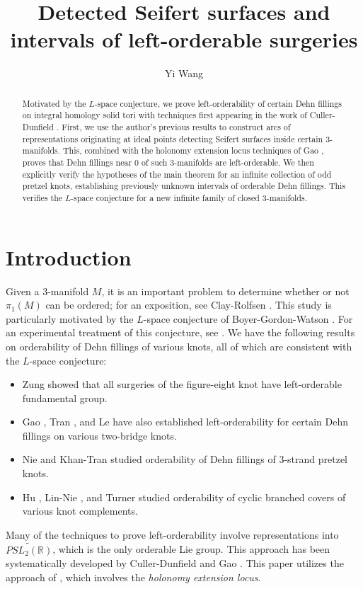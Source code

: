 \documentclass{article}
\title{Detected Seifert surfaces and intervals of left-orderable surgeries}
\author{Yi Wang}
\date{}
\theoremstyle{plain}
\theoremstyle{definition}
\theoremstyle{plain}
\theoremstyle{plain}
\theoremstyle{plain}
\theoremstyle{remark}
\theoremstyle{remark}
\theoremstyle{plain}
\theoremstyle{plain}
\begin{document}
	
\maketitle
	
\begin{abstract}
Motivated by the $L$-space conjecture, we prove left-orderability of certain Dehn fillings on integral homology solid tori with techniques first appearing in the work of Culler-Dunfield \cite{cullerdunfield}. First, we use the author's previous results \cite{wang} to construct arcs of representations originating at ideal points detecting Seifert surfaces inside certain 3-manifolds. This, combined with the holonomy extension locus techniques of Gao \cite{gao}, proves that Dehn fillings near 0 of such 3-manifolds are left-orderable. We then explicitly verify the hypotheses of the main theorem for an infinite collection of odd pretzel knots, establishing previously unknown intervals of orderable Dehn fillings. This verifies the $L$-space conjecture for a new infinite family of closed 3-manifolds. 
\end{abstract}

\section{Introduction}

Given a 3-manifold $M$, it is an important problem to determine whether or not $\pi_1(M)$ can be ordered; for an exposition, see Clay-Rolfsen \cite{clayrolfsen}. This study is particularly motivated by the $L$-space conjecture of Boyer-Gordon-Watson \cite{bgw}. For an experimental treatment of this conjecture, see \cite{dunfieldcensus}. We have the following results on orderability of Dehn fillings of various knots, all of which are consistent with the $L$-space conjecture:
\begin{itemize}
	\item Zung \cite{zung} showed that all surgeries of the figure-eight knot have left-orderable fundamental group.
	\item Gao \cite{gaotwobridge}, Tran \cite{tran}, and Le \cite{khanh} have also established left-orderability for certain Dehn fillings on various two-bridge knots.
	\item Nie \cite{niepretzel} and Khan-Tran \cite{khantran} studied orderability of Dehn fillings of 3-strand pretzel knots.
	\item Hu \cite{hu}, Lin-Nie \cite{linnie}, and Turner \cite{turner} studied orderability of cyclic branched covers of various knot complements.
\end{itemize}   
Many of the techniques to prove left-orderability involve representations into $\widetilde{PSL_2(\mathbb{R})}$, which is the only orderable Lie group. This approach has been systematically developed by Culler-Dunfield \cite{cullerdunfield} and Gao \cite{gao}. This paper utilizes the approach of \cite{gao}, which involves the \emph{holonomy extension locus}. 
\end{document}
